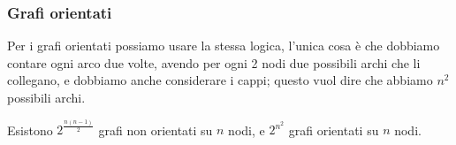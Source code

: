 \subsubsection{Grafi orientati}
Per i grafi orientati possiamo usare la stessa logica, l'unica cosa è che dobbiamo contare ogni arco due volte, avendo per ogni 2 nodi due possibili archi che li collegano, e dobbiamo anche considerare i cappi; questo vuol dire che abbiamo $n^2$ possibili archi.
\begin{theorem}
Esistono $2^{\frac{n(n-1)}{2}}$ grafi non orientati su $n$ nodi, e $2^{n^2}$ grafi orientati su $n$ nodi.
\end{theorem}